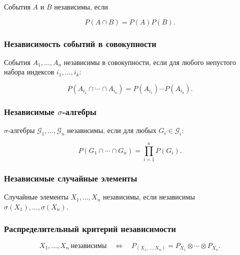 \documentclass[
  11pt,
  a4paper,
]{article}
\begin{document}
События \(A\) и \(B\) независимы, если

\[
P(A\cap B)=P(A)P(B).
\]

\subsubsection{Независимость событий в
совокупности}\label{ux43dux435ux437ux430ux432ux438ux441ux438ux43cux43eux441ux442ux44c-ux441ux43eux431ux44bux442ux438ux439-ux432-ux441ux43eux432ux43eux43aux443ux43fux43dux43eux441ux442ux438}

События \(A_1,\ldots,A_n\) независимы в совокупности, если для любого
непустого набора индексов \(i_1,\ldots,i_k\):

\[
P(A_{i_1}\cap\cdots\cap A_{i_k})
=
P(A_{i_1})\cdots P(A_{i_k}).
\]

\subsubsection{\texorpdfstring{Независимые
\(\sigma\)-алгебры}{Независимые \textbackslash sigma-алгебры}}\label{ux43dux435ux437ux430ux432ux438ux441ux438ux43cux44bux435-sigma-ux430ux43bux433ux435ux431ux440ux44b}

\(\sigma\)-алгебры \(\mathcal G_1,\ldots,\mathcal G_n\) независимы, если
для любых \(G_i\in\mathcal G_i\):

\[
P(G_1\cap\cdots\cap G_n)
=
\prod_{i=1}^nP(G_i).
\]

\subsubsection{Независимые случайные
элементы}\label{ux43dux435ux437ux430ux432ux438ux441ux438ux43cux44bux435-ux441ux43bux443ux447ux430ux439ux43dux44bux435-ux44dux43bux435ux43cux435ux43dux442ux44b}

Случайные элементы \(X_1,\ldots,X_n\) независимы, если независимы
\(\sigma(X_1),\ldots,\sigma(X_n)\).

\subsubsection{Распределительный критерий
независимости}\label{ux440ux430ux441ux43fux440ux435ux434ux435ux43bux438ux442ux435ux43bux44cux43dux44bux439-ux43aux440ux438ux442ux435ux440ux438ux439-ux43dux435ux437ux430ux432ux438ux441ux438ux43cux43eux441ux442ux438}

\[
X_1,\ldots,X_n\ \text{независимы}
\quad\Longleftrightarrow\quad
P_{(X_1,\ldots,X_n)}
=
P_{X_1}\otimes\cdots\otimes P_{X_n}.
\]
\end{document}

